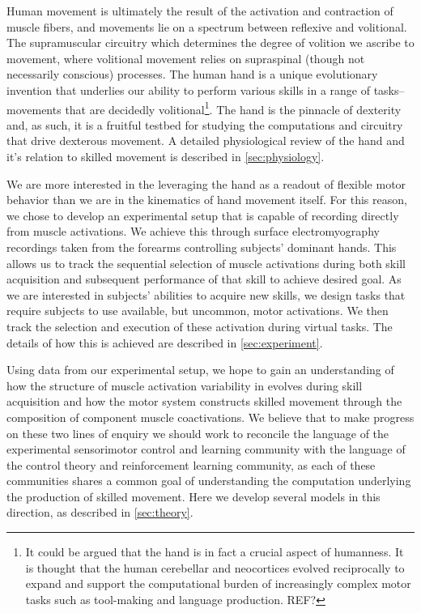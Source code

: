 \documentclass[
  a4paper,
]{article}
\begin{document}
Human movement is ultimately the result of the activation and
contraction of muscle fibers, and movements lie on a spectrum between
reflexive and volitional. The supramuscular circuitry which determines
the degree of volition we ascribe to movement, where volitional movement
relies on supraspinal (though not necessarily conscious) processes. The
human hand is a unique evolutionary invention that underlies our ability
to perform various skills in a range of tasks-- movements that are
decidedly volitional\footnote{It could be argued that the hand is in
  fact a crucial aspect of humanness. It is thought that the human
  cerebellar and neocortices evolved reciprocally to expand and support
  the computational burden of increasingly complex motor tasks such as
  tool-making and language production. REF?}. The hand is the pinnacle
of dexterity and, as such, it is a fruitful testbed for studying the
computations and circuitry that drive dexterous movement. A detailed
physiological review of the hand and it's relation to skilled movement
is described in \cref{sec:physiology}.

We are more interested in the leveraging the hand as a readout of
flexible motor behavior than we are in the kinematics of hand movement
itself. For this reason, we chose to develop an experimental setup that
is capable of recording directly from muscle activations. We achieve
this through surface electromyography recordings taken from the forearms
controlling subjects' dominant hands. This allows us to track the
sequential selection of muscle activations during both skill acquisition
and subsequent performance of that skill to achieve desired goal. As we
are interested in subjects' abilities to acquire new skills, we design
tasks that require subjects to use available, but uncommon, motor
activations. We then track the selection and execution of these
activation during virtual tasks. The details of how this is achieved are
described in \cref{sec:experiment}.

Using data from our experimental setup, we hope to gain an understanding
of how the structure of muscle activation variability in evolves during
skill acquisition and how the motor system constructs skilled movement
through the composition of component muscle coactivations. We believe
that to make progress on these two lines of enquiry we should work to
reconcile the language of the experimental sensorimotor control and
learning community with the language of the control theory and
reinforcement learning community, as each of these communities shares a
common goal of understanding the computation underlying the production
of skilled movement. Here we develop several models in this direction,
as described in \cref{sec:theory}.
\end{document}
